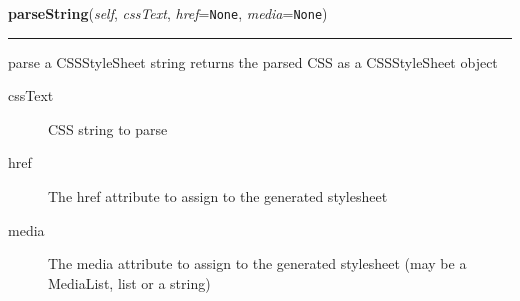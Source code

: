     \label{cssutils:parse':CSSParser:parseString}

    \vspace{0.5ex}

\hspace{.8\funcindent}\begin{boxedminipage}{\funcwidth}

    \raggedright \textbf{parseString}(\textit{self}, \textit{cssText}, \textit{href}={\tt None}, \textit{media}={\tt None})

    \vspace{-1.5ex}

    \rule{\textwidth}{0.5\fboxrule}
\setlength{\parskip}{2ex}

parse a CSSStyleSheet string
returns the parsed CSS as a CSSStyleSheet object
\begin{description}
\item[{cssText}] \leavevmode 
CSS string to parse

\item[{href}] \leavevmode 
The href attribute to assign to the generated stylesheet

\item[{media}] \leavevmode 
The media attribute to assign to the generated stylesheet
(may be a MediaList, list or a string)

\end{description}
\setlength{\parskip}{1ex}
    \end{boxedminipage}

    \label{cssutils:parse':CSSParser:parse}

    \vspace{0.5ex}


